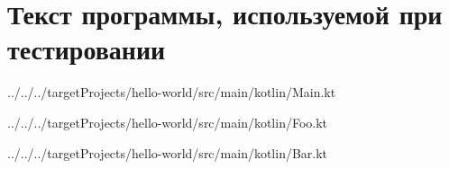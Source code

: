 \chapter{Текст программы, используемой при тестировании}
\label{ch:target_prog}


{../../../targetProjects/hello-world/src/main/kotlin/Main.kt}


{../../../targetProjects/hello-world/src/main/kotlin/Foo.kt}


{../../../targetProjects/hello-world/src/main/kotlin/Bar.kt}